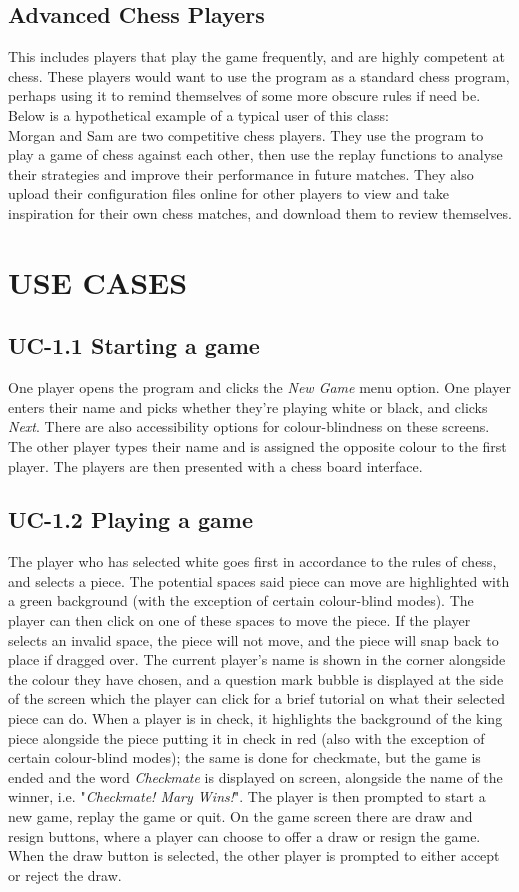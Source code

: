 \documentclass{project}
\begin{document}
\subsection{Advanced Chess Players}
This includes players that play the game frequently, and are highly competent at chess. These players would want to use the program as a standard chess program, perhaps using it to remind themselves of some more obscure rules if need be. Below is a hypothetical example of a typical user of this class:\\
Morgan and Sam are two competitive chess players. They use the program to play a game of chess against each other, then use the replay functions to analyse their strategies and improve their performance in future matches. They also upload their configuration files online for other players to view and take inspiration for their own chess matches, and download them to review themselves.
\section{USE CASES}
\subsection{UC-1.1 Starting a game}
One player opens the program and clicks the \emph{New Game} menu option. One player enters their name and picks whether they're playing white or black, and clicks \emph{Next}. There are also accessibility options for colour-blindness on these screens. The other player types their name and is assigned the opposite colour to the first player. The players are then presented with a chess board interface.
\subsection{UC-1.2 Playing a game}
The player who has selected white goes first in accordance to the rules of chess, and selects a piece. The potential spaces said piece can move are highlighted with a green background (with the exception of certain colour-blind modes). The player can then click on one of these spaces to move the piece. If the player selects an invalid space, the piece will not move, and the piece will snap back to place if dragged over. The current player's name is shown in the corner alongside the colour they have chosen, and a question mark bubble is displayed at the side of the screen which the player can click for a brief tutorial on what their selected piece can do. When a player is in check, it highlights the background of the king piece alongside the piece putting it in check in red (also with the exception of certain colour-blind modes); the same is done for checkmate, but the game is ended and the word \emph{Checkmate} is displayed on screen, alongside the name of the winner, i.e. "\emph{Checkmate! Mary Wins!}". The player is then prompted to start a new game, replay the game or quit. On the game screen there are draw and resign buttons, where a player can choose to offer a draw or resign the game. When the draw button is selected, the other player is prompted to either accept or reject the draw.
\end{document}
